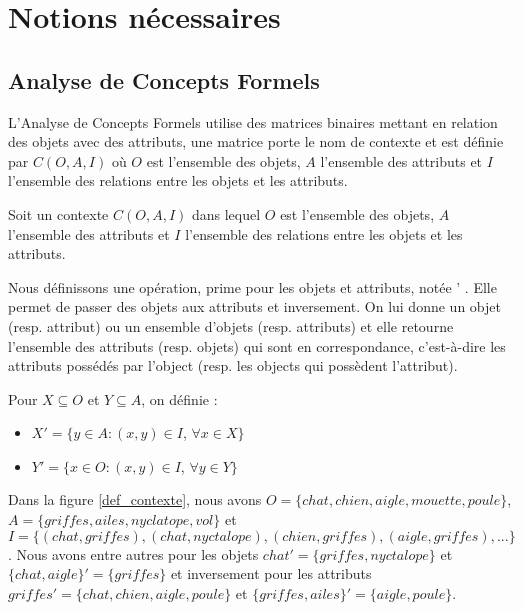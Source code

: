 \chapter{Notions nécessaires}

\section{Analyse de Concepts Formels}

L'Analyse de Concepts Formels utilise des matrices binaires mettant en relation des objets avec des attributs, une matrice porte le nom de contexte et est définie par $C(O, A, I)$ où $O$ est l'ensemble des objets, $A$ l'ensemble des attributs et $I$ l'ensemble des relations entre les objets et les attributs.

\begin{definition}[Contexte]
Soit un contexte $C(O, A, I)$ dans lequel $O$ est l'ensemble des objets, $A$ l'ensemble des attributs et $I$ l'ensemble des relations entre les objets et les attributs.
\end{definition}

Nous définissons une opération, \guillemotleft{} prime \guillemotright{} pour les objets et attributs, notée \guillemotleft{} ' \guillemotright{}. Elle permet de passer des objets aux attributs et inversement. On lui donne un objet (resp. attribut) ou un ensemble d'objets (resp. attributs) et elle retourne l'ensemble des attributs (resp. objets) qui sont en correspondance, c'est-à-dire les attributs possédés par l'object (resp. les objects qui possèdent l'attribut).

\begin{definition}
Pour $X \subseteq O$ et $Y \subseteq A$, on définie :
\begin{itemize}
	\item $X' = \{y \in A : (x, y) \in I$, $\forall x \in X\}$
	\item $Y' = \{x \in O : (x, y) \in I$, $\forall y \in Y\}$
\end{itemize}
\end{definition}

Dans la figure \ref{def_contexte}, nous avons $O = \{chat, chien, aigle, mouette, poule\}$, $A = \{griffes, ailes, nyclatope, vol\}$ et $I = \{(chat, griffes), (chat, nyctalope), (chien, griffes), (aigle, griffes), ...\}$. Nous avons entre autres pour les objets $chat' = \{griffes, nyctalope\}$ et $\{chat, aigle\}' = \{griffes\}$ et inversement pour les attributs $griffes' = \{chat, chien, aigle, poule\}$ et $\{griffes, ailes\}' = \{aigle, poule\}$.

